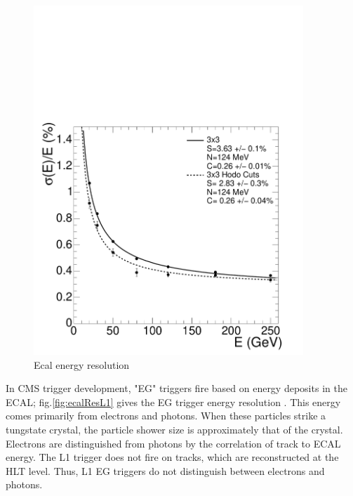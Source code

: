 \begin{figure}[h!]
\begin{centering}
\includegraphics[width=4in]{Chapter3/importfigs/Figure_001-007.pdf}
\par\end{centering}
\caption{Ecal energy resolution \cite{Bayatian:2006nff} \label{fig:ecalRes}}
\end{figure}
 
In CMS trigger development, "EG" triggers fire based on energy deposits in the ECAL; fig.\ref{fig:ecalResL1} gives the EG trigger energy resolution \cite{Bayatian:2006nff}. This energy comes primarily from electrons and photons. When these particles strike a tungstate crystal, the particle shower size is approximately that of the crystal. Electrons are distinguished from photons by the correlation of track to ECAL energy. The L1 trigger does not fire on tracks, which are reconstructed at the HLT level. Thus, L1 EG triggers do not distinguish between electrons and photons. 

